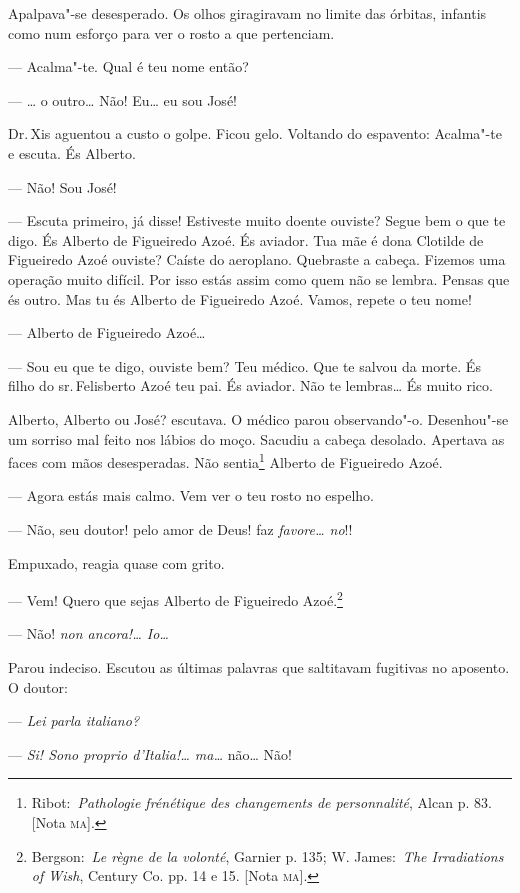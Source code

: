 \begin{linenumbers}
Apalpava"-se desesperado. Os olhos giragiravam no limite das órbitas,
infantis como num esforço para ver o rosto a que pertenciam.

--- Acalma"-te. Qual é teu nome então?

--- \ldots{} o outro\ldots{} Não! Eu\ldots{} eu sou José!

Dr.\,Xis aguentou a custo o golpe. Ficou gelo. Voltando do espavento:
Acalma"-te e escuta. És Alberto.

--- Não! Sou José!

--- Escuta primeiro, já disse! Estiveste muito doente ouviste? Segue bem
o que te digo. És Alberto de Figueiredo Azoé. És aviador. Tua mãe é dona
Clotilde de Figueiredo Azoé ouviste? Caíste do aeroplano. Quebraste a
cabeça. Fizemos uma operação muito difícil. Por isso estás assim como
quem não se lembra. Pensas que és outro. Mas tu és Alberto de Figueiredo
Azoé. Vamos, repete o teu nome!

--- Alberto de Figueiredo Azoé\ldots{}

--- Sou eu que te digo, ouviste bem? Teu médico. Que te salvou da morte.
És filho do sr.\,Felisberto Azoé teu pai. És aviador. Não te lembras\ldots{}
És muito rico.

Alberto, Alberto ou José? escutava. O médico parou observando"-o.
Desenhou"-se um sorriso mal feito nos lábios do moço. Sacudiu a cabeça
desolado. Apertava as faces com mãos desesperadas. Não sentia\footnote{Ribot:~\emph{Pathologie
  frénétique des changements de personnalité}, Alcan p. 83. {[}Nota
  \textsc{ma}{]}.} Alberto de Figueiredo Azoé.

--- Agora estás mais calmo. Vem ver o teu rosto no espelho.

--- Não, seu doutor! pelo amor de Deus! faz \emph{favore\ldots{} no}!!

Empuxado, reagia quase com grito.

--- Vem! Quero que sejas Alberto de Figueiredo Azoé.\footnote{Bergson:~\emph{Le
  règne de la volonté}, Garnier p. 135; W. James:~\emph{The Irradiations
  of Wish}, Century Co. pp. 14 e 15. {[}Nota \textsc{ma}{]}.}

--- Não! \emph{non ancora!\ldots{} Io\ldots{}}

Parou indeciso. Escutou as últimas palavras que saltitavam fugitivas no
aposento. O doutor:

--- \emph{Lei parla italiano?}

--- \emph{Si! Sono proprio d'Italia!\ldots{} ma\ldots{}} não\ldots{} Não!


\end{linenumbers}
